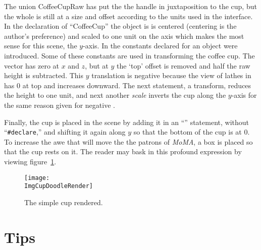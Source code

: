 		The union CoffeeCupRaw has put the the handle in juxtaposition
		to the cup, but the whole is still at a size and offset
		according to the units used in the \IXpkg{} interface.
		In the declaration of ``CoffeeCup'' the object is
		is centered (centering is the author's preference) and
		scaled to one unit on the axis which makes the most sense
		for this scene, the $y$-axis. In
		the constants declared for an object were introduced.
		Some of these constants are used in transforming
		the coffee cup. The \emph{}
		vector has zero at $x$ and $z$, but at $y$ the
		`top' offset is removed and half the raw height
		is subtracted. This $y$ translation is negative
		because the view of lathes in \IXpkg{} has $0$
		at top and increases downward. The next statement,
		a \emph{} transform, reduces the height
		to one unit, and next another \emph{scale}
		inverts the cup along the $y$-axis for the same
		reason given for negative .
		
		Finally, the cup is placed in the scene by adding
		it in an ``'' statement,
		without ``\verb!#declare!,'' and shifting it again
		along $y$ so that the bottom of the cup
		is at $0$. To increase
		the awe that will move the the patrons of \emph{MoMA},
		a box is placed so that the cup rests on it.
		The reader may bask in this profound expression
		by viewing figure~\ref{fig:cup_doodle_render}.

		\begin{figure}[htbp]
		\centering
		\texttt{[image: \\ImgCupDoodleRender]}
		\caption{The simple cup rendered.}
		\label{fig:cup_doodle_render}
		\end{figure}


	\section{Tips}%
	\label{sec:tips_tricks}


